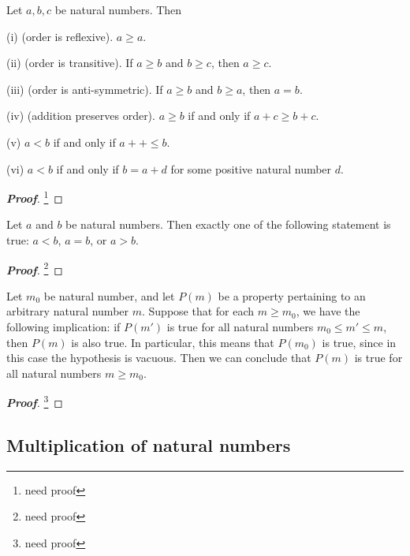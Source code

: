 \begin{proposition}
Let $a,b,c$ be natural numbers. Then
\ben
\item [(i)] (order is reflexive). $a\geq a$.
\item [(ii)] (order is transitive). If $a\geq b$ and $b\geq c$, then $a\geq c$.
\item [(iii)] (order is anti-symmetric). If $a\geq b$ and $b\geq a$, then $a=b$.
\item [(iv)] (addition preserves order). $a\geq b$ if and only if $a+c \geq b+c$.
\item [(v)] $a<b$ if and only if $a++ \leq b$.
\item [(vi)] $a<b$ if and only if $b=a+d$ for some positive natural number $d$.
\een
\end{proposition}

\begin{proof}[\bf Proof]
\footnote{need proof}
\end{proof}

\begin{proposition}
Let $a$ and $b$ be natural numbers. Then exactly one of the following statement is true: $a<b$, $a=b$, or $a>b$.
\end{proposition}

\begin{proof}[\bf Proof]
\footnote{need proof}
\end{proof}

\begin{proposition}
Let $m_0$ be natural number, and let $P(m)$ be a property pertaining to an arbitrary natural number $m$. Suppose that for each $m\geq m_0$, we have the following implication: if $P(m')$ is true for all natural numbers $m_0\leq m'\leq m$, then $P(m)$ is also true. In particular, this means that $P(m_0)$ is true, since in this case the hypothesis is vacuous. Then we can conclude that $P(m)$ is true for all natural numbers $m\geq m_0$.
\end{proposition}

\begin{proof}[\bf Proof]
\footnote{need proof}
\end{proof}

\subsection{Multiplication of natural numbers}

